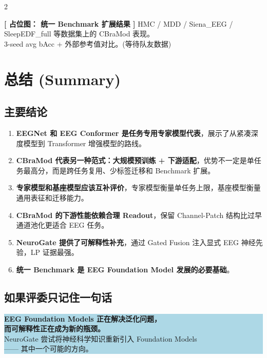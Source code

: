 \documentclass[12pt, a0paper]{article}
\renewcommand{\large}{\fontsize{28}{36}\selectfont}
\renewcommand{\Large}{\fontsize{34}{42}\selectfont}
\renewcommand{\LARGE}{\fontsize{40}{48}\selectfont}
\renewcommand{\small}{\fontsize{18}{24}\selectfont}
\newcommand{\placeholder}[2]{%
    \begin{center}
    \colorbox{mygray!12}{\parbox{0.9\columnwidth}{%
        \centering
        \vspace{1.5em}
        {\Large\bfseries\color{mygray} [ 占位图： #1 ]}
        \vspace{0.8em}
        {\small\color{mygray} #2}
        \vspace{1.5em}
    }}
    \end{center}
}
\begin{document}
\begin{multicols}{2}
\placeholder{统一 Benchmark 扩展结果}{%
    HMC / MDD / Siena\_EEG / SleepEDF\_full 等数据集上的 CBraMod 表现。\\
    3-seed avg bAcc + 外部参考值对比。\quad (等待队友数据)}

\section{总结 (Summary)}

\subsection{主要结论}

\begin{enumerate}[leftmargin=2em]
    \item \textbf{EEGNet 和 EEG Conformer 是任务专用专家模型代表}，展示了从紧凑深度模型到 Transformer 增强模型的路线。
    \item \textbf{CBraMod 代表另一种范式：大规模预训练 + 下游适配}，优势不一定是单任务最高分，而是跨任务复用、少标签迁移和 Benchmark 扩展。
    \item \textbf{专家模型和基座模型应该互补评价}，专家模型衡量单任务上限，基座模型衡量通用表征和迁移能力。
    \item \textbf{CBraMod 的下游性能依赖合理 Readout}，保留 Channel-Patch 结构比过早通道池化更适合 EEG 任务。
    \item \textbf{NeuroGate 提供了可解释性补充}，通过 Gated Fusion 注入显式 EEG 神经先验，LP 证据最强。
    \item \textbf{统一 Benchmark 是 EEG Foundation Model 发展的必要基础}。
\end{enumerate}

\subsection{如果评委只记住一句话}

\begin{center}
\colorbox{lightblue}{\parbox{0.95\columnwidth}{\centering
    {\LARGE\bfseries
        EEG Foundation Models 正在解决泛化问题，\\[3mm]
        而可解释性正在成为新的瓶颈。}\\[4mm]
    {\large
        NeuroGate 尝试将神经科学知识重新引入 Foundation Models\\
        —— 其中一个可能的方向。}
}}
\end{center}


\end{multicols}
\end{document}

